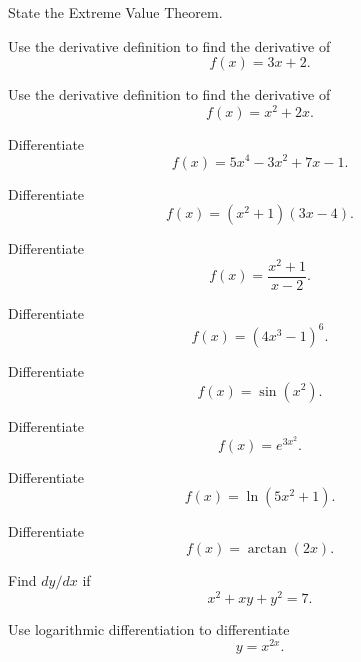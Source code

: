 \begin{exercise}[1]
State the Extreme Value Theorem.
\end{exercise}

\begin{exercise}[2]
Use the derivative definition to find the derivative of
\[ f(x)=3x+2. \]
\end{exercise}

\begin{exercise}[2]
Use the derivative definition to find the derivative of
\[ f(x)=x^2+2x. \]
\end{exercise}

\begin{exercise}[1]
Differentiate
\[ f(x)=5x^4-3x^2+7x-1. \]
\end{exercise}

\begin{exercise}[2]
Differentiate
\[ f(x)=(x^2+1)(3x-4). \]
\end{exercise}

\begin{exercise}[2]
Differentiate
\[ f(x)=\frac{x^2+1}{x-2}. \]
\end{exercise}

\begin{exercise}[2]
Differentiate
\[ f(x)=(4x^3-1)^6. \]
\end{exercise}

\begin{exercise}[2]
Differentiate
\[ f(x)=\sin(x^2). \]
\end{exercise}

\begin{exercise}[2]
Differentiate
\[ f(x)=e^{3x^2}. \]
\end{exercise}

\begin{exercise}[2]
Differentiate
\[ f(x)=\ln(5x^2+1). \]
\end{exercise}

\begin{exercise}[2]
Differentiate
\[ f(x)=\arctan(2x). \]
\end{exercise}

\begin{exercise}[2]
Find \(dy/dx\) if
\[ x^2+xy+y^2=7. \]
\end{exercise}

\begin{exercise}[2]
Use logarithmic differentiation to differentiate
\[ y=x^{2x}. \]
\end{exercise}

